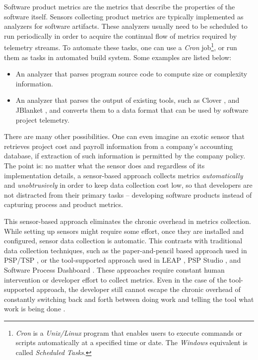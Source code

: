 Software product metrics are the metrics that describe the properties of the software itself. Sensors collecting product metrics are typically implemented as analyzers for software artifacts. These analyzers usually need to be scheduled to run periodically in order to acquire the continual flow of metrics required by telemetry streams. To automate these tasks, one can use a \textit{Cron} job\footnote{\textit{Cron} is a \textit{Unix/Linux} program that enables users to execute commands or scripts automatically at a specified time or date. The \textit{Windows} equivalent is called \textit{Scheduled Tasks}.}, or run them as tasks in automated build system. Some examples are listed below:

\begin{itemize}

	\item An analyzer that parses program source code to compute size or complexity information.
	
	\item An analyzer that parses the output of existing tools, such as Clover \cite{Software:Clover}, and JBlanket \cite{Software:JBlanket}, and converts them to a data format that can be used by software project telemetry.

\end{itemize}

There are many other possibilities. One can even imagine an exotic sensor that retrieves project cost and payroll information from a company's accounting database, if extraction of such information is permitted by the company policy. The point is: no matter what the sensor does and regardless of its implementation details, a sensor-based approach collects metrics \textit{automatically} and \textit{unobtrusively} in order to keep data collection cost low, so that developers are not distracted from their primary tasks -- developing software products instead of capturing process and product metrics.

This sensor-based approach eliminates the chronic overhead in metrics collection. While setting up sensors might require some effort, once they are installed and configured, sensor data collection is automatic. This contrasts with traditional data collection techniques, such as the paper-and-pencil based approach used in PSP/TSP \cite{Humphrey:1995}, or the tool-supported approach used in LEAP \cite{Moore:1999}, PSP Studio \cite{PspStudio:1997}, and Software Process Dashboard \cite{PspDashboard:2000}. These approaches require constant human intervention or developer effort to collect metrics. Even in the case of the tool-supported approach, the developer still cannot escape the chronic overhead of constantly switching back and forth between doing work and telling the tool what work is being done \cite{Johnson:2001, Johnson:2003}.

